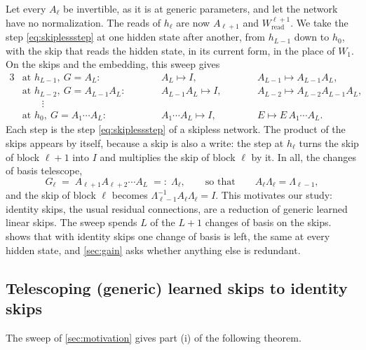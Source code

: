 \documentclass[10pt]{article}
\theoremstyle{definition}
\theoremstyle{remark}
\newcommand{\Wread}{W_{\mathrm{read}}}
\begin{document}
Let every $A_\ell$ be invertible, as it is at generic parameters, and let the network have no normalization. The reads of $h_\ell$ are now $A_{\ell+1}$ and $\Wread^{\ell+1}$. We take the step \eqref{eq:skiplessstep} at one hidden state after another, from $h_{L-1}$ down to $h_0$, with the skip that reads the hidden state, in its current form, in the place of $W_1$. On the skips and the embedding, this sweep gives
\begin{alignat*}{3}
&\text{at } h_{L-1},\ G = A_L\colon &\qquad& A_L \mapsto I, &\qquad& A_{L-1} \mapsto A_{L-1}A_L,\\
&\text{at } h_{L-2},\ G = A_{L-1}A_L\colon && A_{L-1}A_L \mapsto I, && A_{L-2} \mapsto A_{L-2}A_{L-1}A_L,\\
&\qquad\vdots\\
&\text{at } h_0,\ G = A_1\cdots A_L\colon && A_1\cdots A_L \mapsto I, && E \mapsto E\,A_1\cdots A_L.
\end{alignat*}
Each step is the step \eqref{eq:skiplessstep} of a skipless network. The product of the skips appears by itself, because a skip is also a write: the step at $h_\ell$ turns the skip of block $\ell+1$ into $I$ and multiplies the skip of block $\ell$ by it. In all, the changes of basis telescope,
\begin{equation}\label{eq:sweep}
G_\ell \;=\; A_{\ell+1}A_{\ell+2}\cdots A_L \;=:\; \Lambda_\ell, \qquad\text{so that}\qquad A_\ell\Lambda_\ell = \Lambda_{\ell-1},
\end{equation}
and the skip of block $\ell$ becomes $\Lambda_{\ell-1}^{-1}A_\ell\Lambda_\ell = I$. This motivates our study: identity skips, the usual residual connections, are a reduction of generic learned linear skips. The sweep spends $L$ of the $L+1$ changes of basis on the skips.  shows that with identity skips one change of basis is left, the same at every hidden state, and \cref{sec:gain} asks whether anything else is redundant.

\subsection{Telescoping (generic) learned skips to identity skips}\label{sec:learned}

The sweep of \cref{sec:motivation} gives part (i) of the following theorem.
\end{document}
